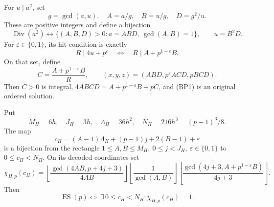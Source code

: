 \begin{theorem}
\label{thm:bp-code}
For \(u\mid a^2\), set
\[
 g=\gcd(a,u),\quad A=a/g,\quad B=u/g,\quad D=g^2/u.
\]
These are positive integers and define a bijection
\[
 \operatorname{Div}(a^2)\longleftrightarrow
 \{(A,B,D)>0:a=ABD,\ \gcd(A,B)=1\},\qquad u=B^2D.
\]
For \(\varepsilon\in\{0,1\}\), its hit condition is exactly
\[
 R\mid4u+p^\varepsilon
 \quad\Longleftrightarrow\quad R\mid A+p^{1-\varepsilon}B.
\]
On that set, define
\[
 C=\frac{A+p^{1-\varepsilon}B}{R},\qquad
 (x,y,z)=(ABD,p^\varepsilon ACD,pBCD).
 \tag{BP1}
\]
Then \(C>0\) is integral, \(4ABCD=A+p^{1-\varepsilon}B+pC\),
and (BP1) is an original ordered solution.

Put
\[
 M_H=6h,\quad J_H=3h,\quad\Lambda_H=36h^2,
 \quad N_H=216h^3=(p-1)^3/8.
\]
The map
\[
 c_H=(A-1)\Lambda_H+(p-1)j+2(B-1)+\varepsilon
 \tag{BP2}
\]
is a bijection from the rectangle
\(1\le A,B\le M_H,\ 0\le j<J_H,\ \varepsilon\in\{0,1\}\)
to \(0\le c_H<N_H\). On its decoded coordinates set
\[
 \chi_{H,p}(c_H)=
 \left\lfloor\frac{\gcd(4AB,p+4j+3)}{4AB}\right\rfloor
 \left\lfloor\frac1{\gcd(A,B)}\right\rfloor
 \left\lfloor\frac{\gcd(4j+3,A+p^{1-\varepsilon}B)}{4j+3}\right\rfloor.
\]
Then
\[
 \operatorname{ES}(p) \Longleftrightarrow\
 \exists\,0\le c_H<N_H:\chi_{H,p}(c_H)=1.
 \tag{BP3}
\]
\end{theorem}
